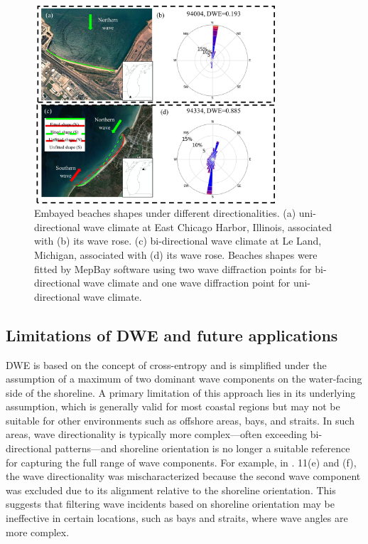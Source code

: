 \begin{figure}[htbp]
  \centering
  \includegraphics[width=0.8\textwidth]{chapter3/resources/figure3-12.jpg}
  \caption{Embayed beaches shapes under different directionalities. (a) uni-directional wave climate at East Chicago Harbor, Illinois, associated with (b) its wave rose. (c) bi-directional wave climate at Le Land, Michigan, associated with (d) its wave rose. Beaches shapes were fitted by MepBay software using two wave diffraction points for bi-directional wave climate and one wave diffraction point for uni-directional wave climate.}
  \label{fig:fig3.12}
\end{figure}

\subsection{Limitations of DWE and future applications}
\label{c3_Limitations of DWE and future applications}
DWE is based on the concept of cross-entropy and is simplified under the assumption of a maximum of two dominant wave components on the water-facing side of the shoreline. A primary limitation of this approach lies in its underlying assumption, which is generally valid for most coastal regions but may not be suitable for other environments such as offshore areas, bays, and straits. In such areas, wave directionality is typically more complex—often exceeding bi-directional patterns—and shoreline orientation is no longer a suitable reference for capturing the full range of wave components. For example, in . 11(e) and (f), the wave directionality was mischaracterized because the second wave component was excluded due to its alignment relative to the shoreline orientation. This suggests that filtering wave incidents based on shoreline orientation may be ineffective in certain locations, such as bays and straits, where wave angles are more complex.

